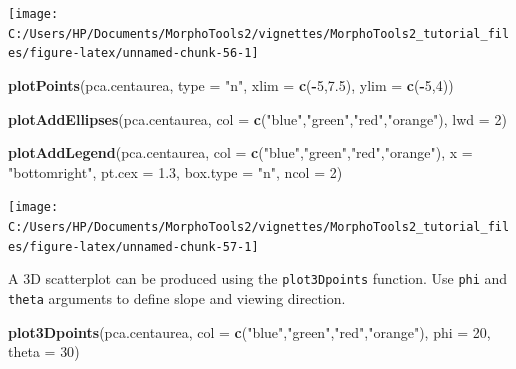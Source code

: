 \documentclass[
]{article}
\newenvironment{Shaded}{\begin{snugshade}}{\end{snugshade}}
\newcommand{\DataTypeTok}[1]{\textcolor[rgb]{0.13,0.29,0.53}{#1}}
\newcommand{\DecValTok}[1]{\textcolor[rgb]{0.00,0.00,0.81}{#1}}
\newcommand{\FloatTok}[1]{\textcolor[rgb]{0.00,0.00,0.81}{#1}}
\newcommand{\KeywordTok}[1]{\textcolor[rgb]{0.13,0.29,0.53}{\textbf{#1}}}
\newcommand{\NormalTok}[1]{#1}
\newcommand{\OperatorTok}[1]{\textcolor[rgb]{0.81,0.36,0.00}{\textbf{#1}}}
\newcommand{\StringTok}[1]{\textcolor[rgb]{0.31,0.60,0.02}{#1}}
\begin{document}
\begin{center}\texttt{[image: C:/Users/HP/Documents/MorphoTools2/vignettes/MorphoTools2\_tutorial\_files/figure-latex/unnamed-chunk-56-1]} \end{center}

\begin{Shaded}
\begin{Highlighting}[]
\KeywordTok{plotPoints}\NormalTok{(pca.centaurea, }\DataTypeTok{type =} \StringTok{"n"}\NormalTok{, }\DataTypeTok{xlim =} \KeywordTok{c}\NormalTok{(}\OperatorTok{-}\DecValTok{5}\NormalTok{,}\FloatTok{7.5}\NormalTok{), }\DataTypeTok{ylim =} \KeywordTok{c}\NormalTok{(}\OperatorTok{-}\DecValTok{5}\NormalTok{,}\DecValTok{4}\NormalTok{))}

\KeywordTok{plotAddEllipses}\NormalTok{(pca.centaurea, }\DataTypeTok{col =} \KeywordTok{c}\NormalTok{(}\StringTok{"blue"}\NormalTok{,}\StringTok{"green"}\NormalTok{,}\StringTok{"red"}\NormalTok{,}\StringTok{"orange"}\NormalTok{), }\DataTypeTok{lwd =} \DecValTok{2}\NormalTok{)}

\KeywordTok{plotAddLegend}\NormalTok{(pca.centaurea, }\DataTypeTok{col =} \KeywordTok{c}\NormalTok{(}\StringTok{"blue"}\NormalTok{,}\StringTok{"green"}\NormalTok{,}\StringTok{"red"}\NormalTok{,}\StringTok{"orange"}\NormalTok{), }
              \DataTypeTok{x =} \StringTok{"bottomright"}\NormalTok{, }\DataTypeTok{pt.cex =} \FloatTok{1.3}\NormalTok{, }\DataTypeTok{box.type =} \StringTok{"n"}\NormalTok{, }\DataTypeTok{ncol =} \DecValTok{2}\NormalTok{)}
\end{Highlighting}
\end{Shaded}

\begin{center}\texttt{[image: C:/Users/HP/Documents/MorphoTools2/vignettes/MorphoTools2\_tutorial\_files/figure-latex/unnamed-chunk-57-1]} \end{center}

A 3D scatterplot can be produced using the \texttt{plot3Dpoints}
function. Use \texttt{phi} and \texttt{theta} arguments to define slope
and viewing direction.

\begin{Shaded}
\begin{Highlighting}[]
\KeywordTok{plot3Dpoints}\NormalTok{(pca.centaurea, }\DataTypeTok{col =} \KeywordTok{c}\NormalTok{(}\StringTok{"blue"}\NormalTok{,}\StringTok{"green"}\NormalTok{,}\StringTok{"red"}\NormalTok{,}\StringTok{"orange"}\NormalTok{), }\DataTypeTok{phi =} \DecValTok{20}\NormalTok{, }\DataTypeTok{theta =} \DecValTok{30}\NormalTok{)}
\end{Highlighting}
\end{Shaded}
\end{document}
